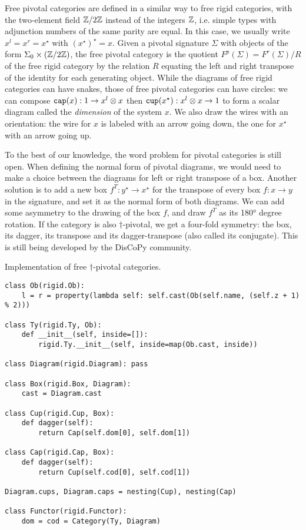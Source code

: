 Free pivotal categories are defined in a similar way to free rigid categories, with the two-element field $\mathbb{Z} / 2 \mathbb{Z}$ instead of the integers $\mathbb{Z}$, i.e. simple types with adjunction numbers of the same parity are equal.
In this case, we usually write $x^l = x^r = x^\star$ with $(x^\star)^\star = x$.
Given a pivotal signature $\Sigma$ with objects of the form $\Sigma_0 \times (\mathbb{Z} / 2 \mathbb{Z})$, the free pivotal category is the quotient $F^p(\Sigma) = F^r(\Sigma) / R$ of the free rigid category by the relation $R$ equating the left and right transpose of the identity for each generating object.
While the diagrams of free rigid categories can have snakes, those of free pivotal categories can have circles: we can compose $\mathtt{cap}(x) : 1 \to x^l \otimes x$ then $\mathtt{cup}(x^\star) : x^l \otimes x \to 1$ to form a scalar diagram called the \emph{dimension} of the system $x$.
We also draw the wires with an orientation: the wire for $x$ is labeled with an arrow going down, the one for $x^\star$ with an arrow going up.

To the best of our knowledge, the word problem for pivotal categories is still open.
When defining the normal form of pivotal diagrams, we would need to make a choice between the diagrams for left or right transpose of a box.
Another solution is to add a new box $f^T : y^\star \to x^\star$ for the transpose of every box $f : x \to y$ in the signature, and set it as the normal form of both diagrams.
We can add some asymmetry to the drawing of the box $f$, and draw $f^T$ as its 180° degree rotation.
If the category is also $\dagger$-pivotal, we get a four-fold symmetry: the box, its dagger, its transpose and its dagger-transpose (also called its conjugate).
This is still being developed by the DisCoPy community.

\begin{python}
{\normalfont Implementation of free $\dagger$-pivotal categories.}

\begin{verbatim}
class Ob(rigid.Ob):
    l = r = property(lambda self: self.cast(Ob(self.name, (self.z + 1) % 2)))

class Ty(rigid.Ty, Ob):
    def __init__(self, inside=[]):
        rigid.Ty.__init__(self, inside=map(Ob.cast, inside))

class Diagram(rigid.Diagram): pass

class Box(rigid.Box, Diagram):
    cast = Diagram.cast

class Cup(rigid.Cup, Box):
    def dagger(self):
        return Cap(self.dom[0], self.dom[1])

class Cap(rigid.Cap, Box):
    def dagger(self):
        return Cup(self.cod[0], self.cod[1])

Diagram.cups, Diagram.caps = nesting(Cup), nesting(Cap)

class Functor(rigid.Functor):
    dom = cod = Category(Ty, Diagram)
\end{verbatim}
\end{python}
